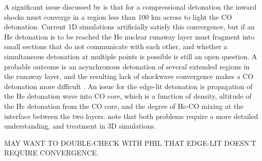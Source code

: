 A significant issue discussed by \citeauthor{woosk10} is that for a compressional detonation the inward shocks must converge in a region less than 100 km across to light the CO detonation.  Current 1D simulations artificially satisfy this convergence, but if an He detonation is to be reached the He nuclear runaway layer must fragment into small sections that do not communicate with each other, and whether a simultaneous detonation at multiple points is possible is still an open question.  A probable outcome is an asynchronous detonation of several extended regions in the runaway layer, and the resulting lack of shockwave convergence makes a CO detonation more difficult \citep{woosk10}.  An issue for the edge-lit detonation is propagation of the He detonation wave into CO core, which is a function of density, altitude of the He detonation from the CO core, and the degree of He-CO mixing at the interface between the two layers.  \citeauthor{woosk10} note that both problems require a more detailed understanding, and treatment in 3D simulations.

MAY WANT TO DOUBLE-CHECK WITH PHIL THAT EDGE-LIT DOESN'T REQUIRE CONVERGENCE.

